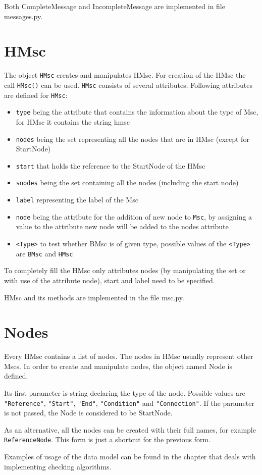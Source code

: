 \documentclass[11pt,oneside]{fithesis2}
\newcommand{\T}[1]{\texttt{#1}}
\newcommand{\ite}[1]{\item{\texttt{#1}}}
\begin{document}
Both CompleteMessage and IncompleteMessage are implemented in file messages.py.


\section{HMsc}
The object \T{HMsc} creates and manipulates HMsc. For creation of the HMsc the call \T{HMsc()} can be used. \T{HMsc} consists of several attributes. Following attributes are defined for \T{HMsc}:

\begin{itemize}
\ite{type} being the attribute that contains the information about the type of Msc, for HMsc it contains the string hmsc
\ite{nodes} being the set representing all the nodes that are in HMsc (except for StartNode)
\ite{start} that holds the reference to the StartNode of the HMsc
\ite{snodes} being the set containing all the nodes (including the start node)
\ite{label} representing the label of the Msc
\ite{node} being the attribute for the addition of new node to \T{Msc}, by assigning a value to the attribute new node will be added to the nodes attribute
\ite{<Type>} to test whether BMsc is of given type, possible values of the \T{<Type>} are \T{BMsc} and \T{HMsc}
\end{itemize}

To completely fill the HMsc only attributes nodes (by manipulating the set or with use of the attribute node), start and label need to be specified.

HMsc and its methods are implemented in the file msc.py.


\section{Nodes}
Every HMsc contains a list of nodes. The nodes in HMsc usually represent other Mscs. In order to create and manipulate nodes, the object named Node is defined.

Its first parameter is string declaring the type of the node. Possible values are \T{"Reference"}, \T{"Start"}, \T{"End"}, \T{"Condition"} and \T{"Connection"}. If the parameter is not passed, the Node is considered to be StartNode.

As an alternative, all the nodes can be created with their full names, for example \T{ReferenceNode}. This form is just a shortcut for the previous form.

Examples of usage of the data model can be found in the chapter that deals with implementing checking algorithms.
\end{document}
